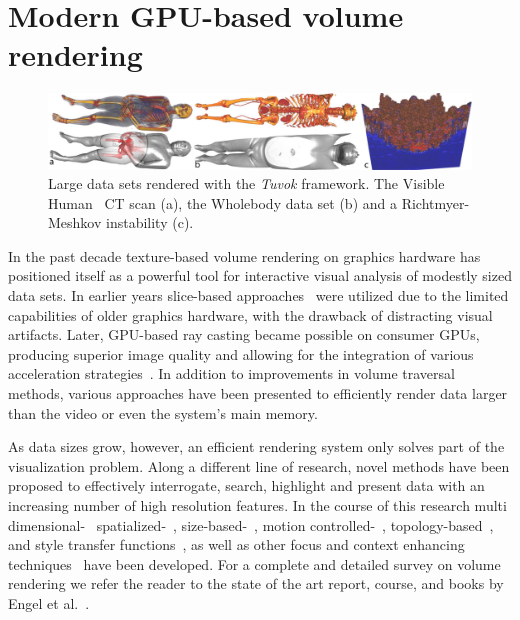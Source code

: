 \section{Modern GPU-based volume rendering}

\begin{figure}
	\includegraphics[width=\linewidth]{images/arch/vh-rm}

  \caption{Large data sets rendered with the \textit{Tuvok} framework.
  The Visible Human~\cite{Yoo:2000:VHuman} CT scan (a), the Wholebody
  data set (b) and a Richtmyer-Meshkov instability (c).}
	\label{figtvk:teaser}
\end{figure}

In the past decade texture-based volume rendering on graphics hardware
has positioned itself as a powerful tool for interactive visual
analysis of modestly sized data sets. In earlier years slice-based
approaches~\cite{Cullip:1993:AVRW, Cabral:1994:AVRA} were utilized
due to the limited capabilities of older graphics hardware, with the
drawback of distracting visual artifacts. Later, GPU-based ray casting
became possible on consumer GPUs, producing superior image quality
and allowing for the integration of various acceleration
strategies~\cite{Krueger:2003:ATGV}.  In addition to improvements in
volume traversal methods, various approaches have been presented to
efficiently render data larger than the video or even the system's main
memory.

As data sizes grow, however, an efficient rendering system only solves
part of the visualization problem. Along a different line of research,
novel methods have been proposed to effectively interrogate, search,
highlight and present data with an increasing number of high resolution
features. In the course of this research multi
dimensional-~\cite{Kniss:2005:Multidim}
spatialized-~\cite{Roettger:2005:Spatialized},
size-based-~\cite{Correa:2008:Size-based}, motion
controlled-~\cite{Correa:2005:Motion},
topology-based~\cite{Weber:2007:Topology},
and style transfer functions~\cite{Bruckner:2007:Style}, as well as
other focus and context enhancing
techniques~\cite{Viola:2005:Illustrative, Wang:2005:Lens,
Krueger:2006:ClearView} have been developed. For a complete and
detailed survey on volume rendering we refer the reader to the state of
the art report, course, and books by Engel et
al.~\cite{Engel:2002:IHQV, Engel:2004:RTVG, Engel:2006:RTVG}.

